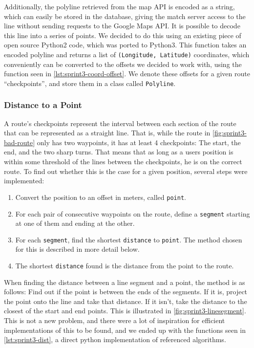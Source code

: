 Additionally, the polyline retrieved from the map API is encoded as a string, which can easily be stored in the database, giving the match server access to the line without sending requests to the Google Maps \ac{API}. It is possible to decode this line into a series of points. We decided to do this using an existing piece of open source Python2 code\cite{decodepolyline}, which was ported to Python3. This function takes an encoded polyline and returns a list of \texttt{(Longitude, Latitude)} coordinates, which conveniently can be converted to the offsets we decided to work with, using the function seen in \autoref{lst:sprint3-coord-offset}. We denote these offsets for a given route ``checkpoints'', and store them in a class called \texttt{Polyline}.

\subsubsection{Distance to a Point}

A route's checkpoints represent the interval between each section of the route that can be represented as a straight line. That is, while the route in \autoref{fig:sprint3-bad-route} only has two waypoints, it has at least 4 checkpoints: The start, the end, and the two sharp turns. That means that as long as a users position is within some threshold of the lines between the checkpoints, he is on the correct route. To find out whether this is the case for a given position, several steps were implemented:

\begin{enumerate}
 \item Convert the position to an offset in meters, called \texttt{point}.
 \item For each pair of consecutive waypoints on the route, define a \texttt{segment} starting at one of them and ending at the other.
 \item For each \texttt{segment}, find the shortest \texttt{distance} to \texttt{point}. The method chosen for this is described in more detail below.
 \item The shortest \texttt{distance} found is the distance from the point to the route.
\end{enumerate}

When finding the distance between a line segment and a point, the method is as follows: Find out if the point is between the ends of the segments. If it is, project the point onto the line and take that distance. If it isn't, take the distance to the closest of the start and end points. This is illustrated in \autoref{fig:sprint3-linesegment}. This is not a new problem, and there were a lot of inspiration for efficient implementations of this to be found\cite{point2line1}\cite{point2line2}, and we ended up with the functions seen in \autoref{lst:sprint3-dist}, a direct python implementation of referenced algorithms.

